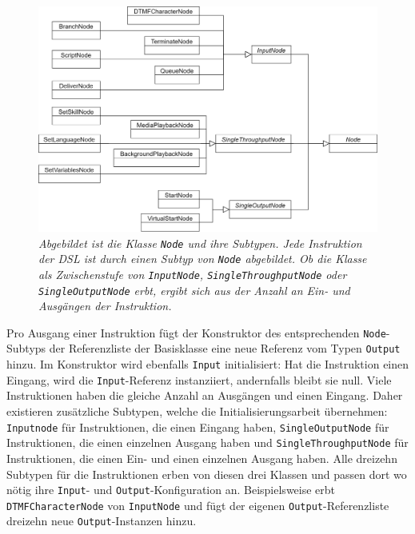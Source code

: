\begin{figure} %
	\centering
		\includegraphics[width=\textwidth]{img/NodeHierarchy.png}
	\caption[Klassenhierarchie der Klasse \texttt{Node}]{\textit{Abgebildet ist die Klasse \texttt{Node} und ihre Subtypen. Jede Instruktion der DSL ist durch einen Subtyp von \texttt{Node} abgebildet. Ob die Klasse als Zwischenstufe von \texttt{InputNode}, \texttt{SingleThroughputNode} oder \texttt{SingleOutputNode} erbt, ergibt sich aus der Anzahl an Ein- und Ausgängen der Instruktion.}}
	\label{fig:UML:Node-Hierarchy}
\end{figure}
\noindent Pro Ausgang einer Instruktion fügt der Konstruktor des entsprechenden \texttt{Node}-Subtyps der Referenzliste der Basisklasse eine neue Referenz vom Typen \texttt{Output} hinzu. Im Konstruktor wird ebenfalls \texttt{Input} initialisiert: Hat die Instruktion einen Eingang, wird die \texttt{Input}-Referenz instanziiert, andernfalls bleibt sie null. Viele Instruktionen haben die gleiche Anzahl an Ausgängen und einen Eingang. Daher existieren zusätzliche Subtypen, welche die Initialisierungsarbeit übernehmen: \texttt{Inputnode} für Instruktionen, die einen Eingang haben, \texttt{SingleOutputNode} für Instruktionen, die einen einzelnen Ausgang haben und \texttt{SingleThroughputNode} für Instruktionen, die einen Ein- und einen einzelnen Ausgang haben. Alle dreizehn Subtypen für die Instruktionen erben von diesen drei Klassen und passen dort wo nötig ihre \texttt{Input}- und \texttt{Output}-Konfiguration an. Beispielsweise erbt \texttt{DTMFCharacterNode} von \texttt{InputNode} und fügt der eigenen \texttt{Output}-Referenzliste dreizehn neue \texttt{Output}-Instanzen hinzu.
\newline
